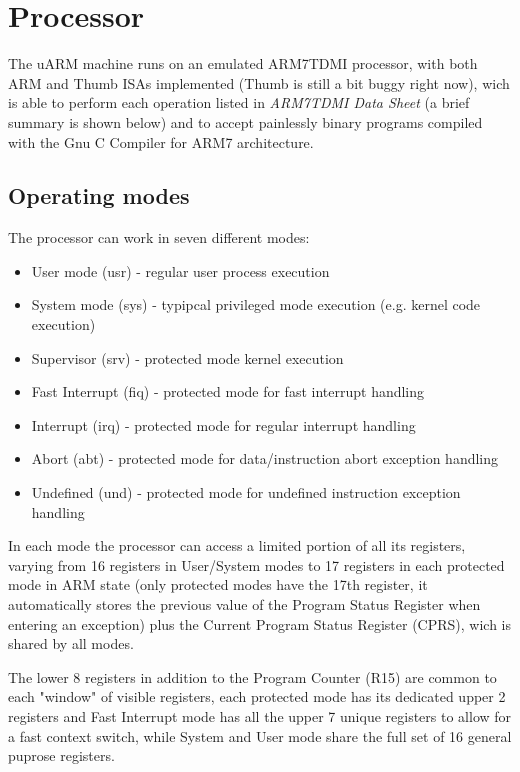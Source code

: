 \chapter{Processor}
The uARM machine runs on an emulated ARM7TDMI processor, with both ARM and Thumb ISAs implemented (Thumb is still a bit buggy right now), wich is able to perform each operation listed in \emph{ARM7TDMI Data Sheet} (a brief summary is shown below) and to accept painlessly binary programs compiled with the Gnu C Compiler for ARM7 architecture.

\section{Operating modes}
The processor can work in seven different modes:
\begin{itemize}
\item User mode (usr) - regular user process execution
\item System mode (sys) - typipcal privileged mode execution (e.g. kernel code execution)
\item Supervisor (srv) - protected mode kernel execution
\item Fast Interrupt (fiq) - protected mode for fast interrupt handling
\item Interrupt (irq) - protected mode for regular interrupt handling
\item Abort (abt) - protected mode for data/instruction abort exception handling
\item Undefined (und) - protected mode for undefined instruction exception handling
\end{itemize}

In each mode the processor can access a limited portion of all its registers, varying from 16 registers in User/System modes to 17 registers in each protected mode in ARM state (only protected modes have the 17th register, it automatically stores the previous value of the Program Status Register when entering an exception) plus the Current Program Status Register (CPRS), wich is shared by all modes.

The lower 8 registers in addition to the Program Counter (R15) are common to each "window" of visible registers, each protected mode has its dedicated upper 2 registers and Fast Interrupt mode has all the upper 7 unique registers to allow for a fast context switch, while System and User mode share the full set of 16 general puprose registers.



